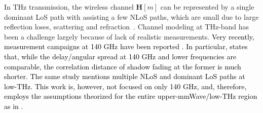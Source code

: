 \documentclass[journal,10pt]{IEEEtran}
\begin{document}
	{\color{black}In THz transmission, the wireless channel $\mathbf{H}[m]$  can be represented by a single dominant  LoS path with assisting a few NLoS paths, which are small due to large reflection loses, scattering and refraction~\cite{ummimoComMagYeLi,ummimoTareq,teraMIMO}. Channel modeling at THz-band has been a challenge largely because of lack of realistic measurements. \textcolor{black}{Very recently, measurement campaigns at 140 GHz have been reported \cite{xing2018propagation,ju2021140}. In particular, \cite{ju2021140} states that, while the delay/angular spread at 140 GHz and lower frequencies are comparable, the correlation distance of shadow fading at the former is much shorter. The same study mentions multiple NLoS and dominant LoS paths at low-THz. This work is, however, not focused on only 140 GHz, and, therefore, employs the assumptions theorized for the entire upper-mmWave/low-THz region as in \cite{teraMIMO}.}
		
}
\end{document}
